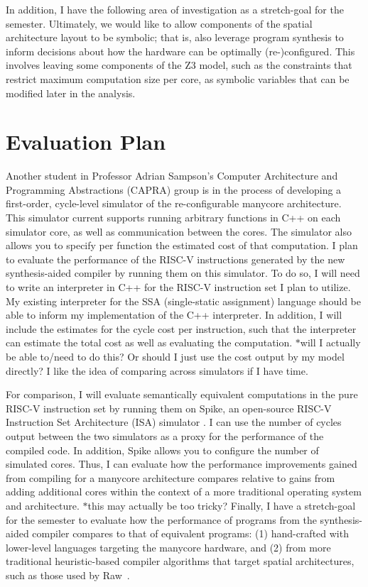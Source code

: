 \documentclass{sig-alternate-05-2015}
\newcommand{\note}{\color{red}$*$}
\begin{document}
In addition, I have the following area of investigation as a stretch-goal for the semester. Ultimately, we would like to allow components of the spatial architecture layout to be symbolic; that is, also leverage program synthesis to inform decisions about how the hardware can be optimally (re-)configured. This involves leaving some components of the Z3 model, such as the constraints that restrict maximum computation size per core, as symbolic variables that can be modified later in the analysis. 

\section{Evaluation Plan}
Another student in Professor Adrian Sampson's Computer Architecture and Programming Abstractions (CAPRA) group is in the process of developing a first-order, cycle-level simulator of the re-configurable manycore architecture. This simulator current supports running arbitrary functions in C++ on each simulator core, as well as communication between the cores. The simulator also allows you to specify per function the estimated cost of that computation. I plan to evaluate the performance of the RISC-V instructions generated by the new synthesis-aided compiler by running them on this simulator. To do so, I will need to write an interpreter in C++ for the RISC-V instruction set I plan to utilize. My existing interpreter for the SSA (single-static assignment) language should be able to inform my implementation of the C++ interpreter. In addition, I will include the estimates for the cycle cost per instruction, such that the interpreter can estimate the total cost as well as evaluating the computation. {\note will I actually be able to/need to do this? Or should I just use the cost output by my model directly? I like the idea of comparing across simulators if I have time.}

For comparison, I will evaluate semantically equivalent computations in the pure RISC-V instruction set by running them on Spike, an open-source RISC-V Instruction Set Architecture (ISA) simulator \cite{risc-v}. I can use the number of cycles output between the two simulators as a proxy for the performance of the compiled code. In addition, Spike allows you to configure the number of simulated cores. Thus, I can evaluate how the performance improvements gained from compiling for a manycore architecture compares relative to gains from adding additional cores within the context of a more traditional operating system and architecture. {\note this may actually be too tricky?} Finally, I have a stretch-goal for the semester to evaluate how the performance of programs from the synthesis-aided compiler compares to that of equivalent programs: (1) hand-crafted with lower-level languages targeting the manycore hardware, and (2) from more traditional heuristic-based compiler algorithms that target spatial architectures, such as those used by Raw~\cite{raw}.
\end{document}
